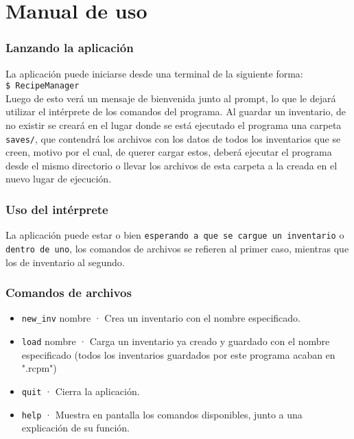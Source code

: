 \documentclass[a4paper]{article}
\begin{document}
\section*{Manual de uso}
\subsubsection*{Lanzando la aplicación}
La aplicación puede iniciarse desde una terminal de la siguiente forma:\\

\texttt{\$ RecipeManager}\\

Luego de esto verá un mensaje de bienvenida junto al prompt, lo que le dejará utilizar el intérprete de los comandos del programa. Al guardar un inventario, de no existir se creará en el lugar donde se está ejecutado el programa una carpeta \texttt{saves/}, que contendrá los archivos con los datos de todos los inventarios que se creen, motivo por el cual, de querer cargar estos, deberá ejecutar el programa desde el mismo directorio o llevar los archivos de esta carpeta a la creada en el nuevo lugar de ejecución.

\subsubsection*{Uso del intérprete}
La aplicación puede estar o bien \texttt{esperando a que se cargue un inventario} o \texttt{dentro de uno}, los comandos de archivos se refieren al primer caso, mientras que los de inventario al segundo.  
\subsubsection*{\small{Comandos de archivos}}
\begin{itemize}
\item \texttt{new\_inv} nombre · Crea un inventario con el nombre especificado.
\item \texttt{load} nombre · Carga un inventario ya creado y guardado con el nombre especificado (todos los inventarios guardados por este programa acaban en ".rcpm")
\item \texttt{quit} · Cierra la aplicación.
\item \texttt{help} · Muestra en pantalla los comandos disponibles, junto a una explicación de su función.
\end{itemize}
\end{document}
